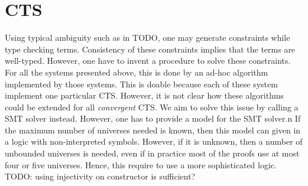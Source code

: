 \documentclass[conference]{IEEEtran}
\newcommand{\universo}{\textsc{Universo}}
\begin{document}


\section{CTS}

Using typical ambiguity such as in TODO, one may generate constraints while type checking terms. Consistency of these constraints implies that the terms are well-typed. However, one have to invent a procedure to solve these constraints. For all the systems presented above, this is done by an ad-hoc algorithm implemented by those systems. This is doable because each of these system implement one particular CTS. However, it is not clear how these algorithms could be extended for all \textit{convergent} CTS. We aim to solve this issue by calling a SMT solver instead. However, one has to provide a model for the SMT solver.n  If the maximum number of universes needed is known, then this model can given in a logic with non-interpreted symbols. However, if it is unknown, then a number of unbounded universes is needed, even if in practice most of the proofs use at most four or five universes. Hence, this require to use a more sophisticated logic. TODO: using injectivity on constructor is sufficient?
\end{document}
